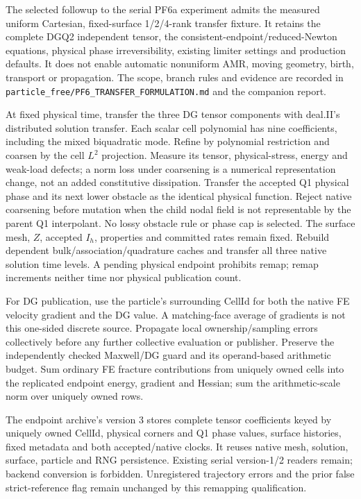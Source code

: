 \documentclass[11pt]{article}
\begin{document}
The selected followup to the serial PF6a experiment admits the measured uniform
Cartesian, fixed-surface 1/2/4-rank transfer fixture. It retains the complete
DGQ2 independent tensor, the consistent-endpoint/reduced-Newton equations,
physical phase irreversibility, existing limiter settings and production
defaults. It does not enable automatic nonuniform AMR, moving geometry, birth,
transport or propagation. The scope, branch rules and evidence are recorded in
\texttt{particle\_free/PF6\_TRANSFER\_FORMULATION.md} and the companion report.

At fixed physical time, transfer the three DG tensor components with deal.II's
distributed solution transfer. Each scalar cell polynomial has nine coefficients,
including the mixed biquadratic mode. Refine by polynomial restriction and
coarsen by the cell $L^2$ projection. Measure its tensor, physical-stress, energy
and weak-load defects; a norm loss under coarsening is a numerical representation
change, not an added constitutive dissipation. Transfer the accepted Q1 physical
phase and its next lower obstacle as the identical physical function. Reject
native coarsening before mutation when the child nodal field is not representable
by the parent Q1 interpolant. No lossy obstacle rule or phase cap is selected.
The surface mesh, $Z$, accepted $I_h$, properties and committed rates remain
fixed. Rebuild dependent bulk/association/quadrature caches and transfer all
three native solution time levels. A pending physical endpoint prohibits remap;
remap increments neither time nor physical publication count.

For DG publication, use the particle's surrounding CellId for both the native
FE velocity gradient and the DG value. A matching-face average of gradients is
not this one-sided discrete source. Propagate local ownership/sampling errors
collectively before any further collective evaluation or publisher. Preserve
the independently checked Maxwell/DG guard and its operand-based arithmetic
budget. Sum ordinary FE fracture contributions from uniquely owned cells into
the replicated endpoint energy, gradient and Hessian; sum the arithmetic-scale
norm over uniquely owned rows.

The endpoint archive's version 3 stores complete tensor coefficients keyed by
uniquely owned CellId, physical corners and Q1 phase values, surface histories,
fixed metadata and both accepted/native clocks. It reuses native mesh, solution,
surface, particle and RNG persistence. Existing serial version-1/2 readers remain;
backend conversion is forbidden. Unregistered trajectory errors and the prior
false strict-reference flag remain unchanged by this remapping qualification.
\end{document}
